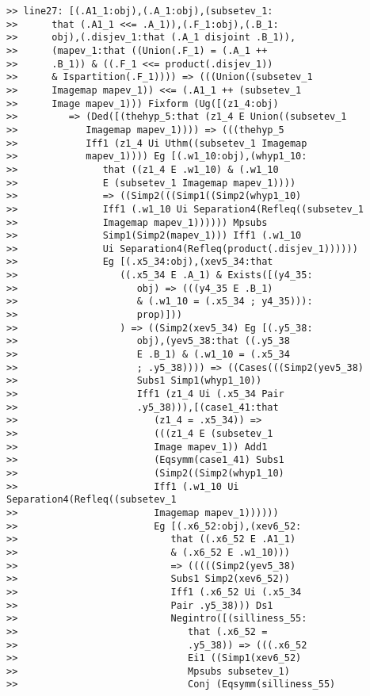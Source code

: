 \documentclass[12pt]{article}
\begin{document}
\begin{verbatim}
>> line27: [(.A1_1:obj),(.A_1:obj),(subsetev_1:
>>      that (.A1_1 <<= .A_1)),(.F_1:obj),(.B_1:
>>      obj),(.disjev_1:that (.A_1 disjoint .B_1)),
>>      (mapev_1:that ((Union(.F_1) = (.A_1 ++
>>      .B_1)) & ((.F_1 <<= product(.disjev_1))
>>      & Ispartition(.F_1)))) => (((Union((subsetev_1
>>      Imagemap mapev_1)) <<= (.A1_1 ++ (subsetev_1
>>      Image mapev_1))) Fixform (Ug([(z1_4:obj)
>>         => (Ded([(thehyp_5:that (z1_4 E Union((subsetev_1
>>            Imagemap mapev_1)))) => (((thehyp_5
>>            Iff1 (z1_4 Ui Uthm((subsetev_1 Imagemap
>>            mapev_1)))) Eg [(.w1_10:obj),(whyp1_10:
>>               that ((z1_4 E .w1_10) & (.w1_10
>>               E (subsetev_1 Imagemap mapev_1))))
>>               => ((Simp2(((Simp1((Simp2(whyp1_10)
>>               Iff1 (.w1_10 Ui Separation4(Refleq((subsetev_1
>>               Imagemap mapev_1)))))) Mpsubs
>>               Simp1(Simp2(mapev_1))) Iff1 (.w1_10
>>               Ui Separation4(Refleq(product(.disjev_1))))))
>>               Eg [(.x5_34:obj),(xev5_34:that
>>                  ((.x5_34 E .A_1) & Exists([(y4_35:
>>                     obj) => (((y4_35 E .B_1)
>>                     & (.w1_10 = (.x5_34 ; y4_35))):
>>                     prop)]))
>>                  ) => ((Simp2(xev5_34) Eg [(.y5_38:
>>                     obj),(yev5_38:that ((.y5_38
>>                     E .B_1) & (.w1_10 = (.x5_34
>>                     ; .y5_38)))) => ((Cases(((Simp2(yev5_38)
>>                     Subs1 Simp1(whyp1_10))
>>                     Iff1 (z1_4 Ui (.x5_34 Pair
>>                     .y5_38))),[(case1_41:that
>>                        (z1_4 = .x5_34)) =>
>>                        (((z1_4 E (subsetev_1
>>                        Image mapev_1)) Add1
>>                        (Eqsymm(case1_41) Subs1
>>                        (Simp2((Simp2(whyp1_10)
>>                        Iff1 (.w1_10 Ui Separation4(Refleq((subsetev_1
>>                        Imagemap mapev_1))))))
>>                        Eg [(.x6_52:obj),(xev6_52:
>>                           that ((.x6_52 E .A1_1)
>>                           & (.x6_52 E .w1_10)))
>>                           => (((((Simp2(yev5_38)
>>                           Subs1 Simp2(xev6_52))
>>                           Iff1 (.x6_52 Ui (.x5_34
>>                           Pair .y5_38))) Ds1
>>                           Negintro([(silliness_55:
>>                              that (.x6_52 =
>>                              .y5_38)) => (((.x6_52
>>                              Ei1 ((Simp1(xev6_52)
>>                              Mpsubs subsetev_1)
>>                              Conj (Eqsymm(silliness_55)

\end{verbatim}
\end{document}
